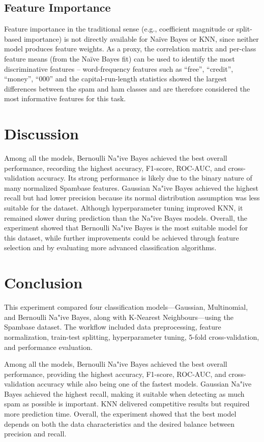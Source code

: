\documentclass[12pt,a4paper]{article}
\begin{document}
\subsection*{Feature Importance}
Feature importance in the traditional sense (e.g., coefficient magnitude or split-based importance) is not directly available for Na\"ive Bayes or KNN, since neither model produces feature weights. As a proxy, the correlation matrix and per-class feature means (from the Na\"ive Bayes fit) can be used to identify the most discriminative features -- word-frequency features such as ``free'', ``credit'', ``money'', ``000'' and the capital-run-length statistics showed the largest differences between the spam and ham classes and are therefore considered the most informative features for this task.

\section{Discussion}
Among all the models, Bernoulli Na"ive Bayes achieved the best overall performance, recording the highest accuracy, F1-score, ROC-AUC, and cross-validation accuracy. Its strong performance is likely due to the binary nature of many normalized Spambase features. Gaussian Na"ive Bayes achieved the highest recall but had lower precision because its normal distribution assumption was less suitable for the dataset. Although hyperparameter tuning improved KNN, it remained slower during prediction than the Na"ive Bayes models. Overall, the experiment showed that Bernoulli Na"ive Bayes is the most suitable model for this dataset, while further improvements could be achieved through feature selection and by evaluating more advanced classification algorithms.


\section{Conclusion}
This experiment compared four classification models—Gaussian, Multinomial, and Bernoulli Na"ive Bayes, along with K-Nearest Neighbours—using the Spambase dataset. The workflow included data preprocessing, feature normalization, train-test splitting, hyperparameter tuning, 5-fold cross-validation, and performance evaluation.

Among all the models, Bernoulli Na"ive Bayes achieved the best overall performance, providing the highest accuracy, F1-score, ROC-AUC, and cross-validation accuracy while also being one of the fastest models. Gaussian Na"ive Bayes achieved the highest recall, making it suitable when detecting as much spam as possible is important. KNN delivered competitive results but required more prediction time. Overall, the experiment showed that the best model depends on both the data characteristics and the desired balance between precision and recall.
\end{document}

